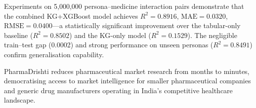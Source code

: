 \documentclass[10pt,journal,compsoc]{IEEEtran}
\begin{document}
Experiments on 5{,}000{,}000 persona--medicine interaction pairs demonstrate that the
combined KG+XGBoost model achieves $R^2=0.8916$, $\text{MAE}=0.0320$,
$\text{RMSE}=0.0400$---a statistically significant improvement over the tabular-only
baseline ($R^2=0.8502$) and the KG-only model ($R^2=0.1529$).
The negligible train--test gap (0.0002) and strong performance on unseen personas
($R^2=0.8491$) confirm generalisation capability.

PharmaDrishti reduces pharmaceutical market research from months to minutes,
democratising access to market intelligence for smaller pharmaceutical companies and
generic drug manufacturers operating in India's competitive healthcare landscape.

\end{document}
